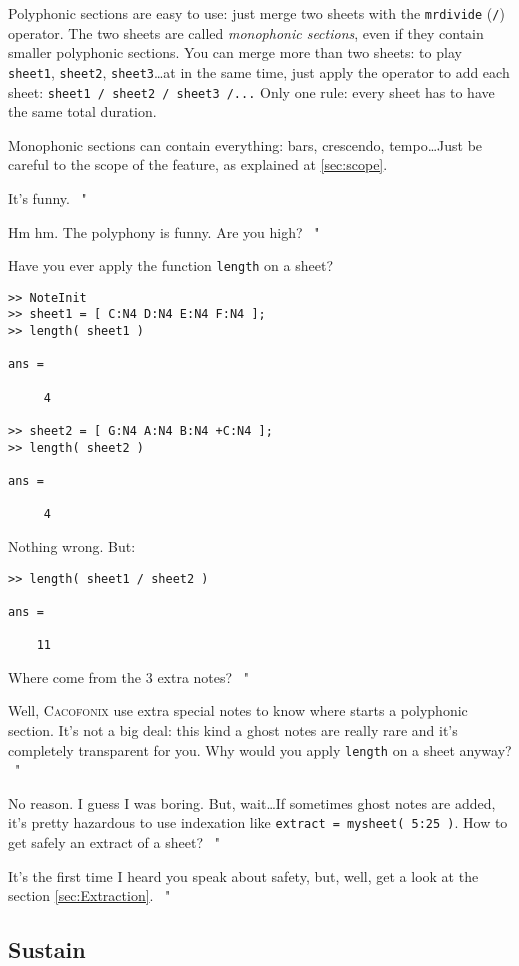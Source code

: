 \documentclass{article}
\newcommand\cacofonix{\textsc{Cacofonix}\xspace}
\newenvironment{meenv}{ \par \noindent \makebox[6em][r]{ \textcolor{mecolor}{Me}: " --~}}{~"}
\newenvironment{myselfenv}{ \par \noindent \makebox[6em][r]{ \textcolor{myselfcolor}{Myself}: " --~}}{~"}
\newcommand{ \me }[1]{%
\begin{meenv}%
	#1%
\end{meenv} }
\newcommand{ \myself }[1]{%
\begin{myselfenv}%
	#1%
\end{myselfenv} }
\begin{document}
Polyphonic sections are easy to use: just merge two sheets with the \lstinline!mrdivide! (\lstinline!/!) operator. The two sheets are called \emph{monophonic sections}, even if they contain smaller polyphonic sections. You can merge more than two sheets: to play \lstinline!sheet1!, \lstinline!sheet2!, \lstinline!sheet3!\dots at in the same time, just apply the operator to add each sheet: \lstinline!sheet1 / sheet2 / sheet3 /...! Only one rule: every sheet has to have the same total duration.

Monophonic sections can contain everything: bars, crescendo, tempo\dots Just be careful to the scope of the feature, as explained at \ref{sec:scope}.

\me{It's funny.}
\myself{Hm hm. The polyphony is funny. Are you high?}
\begin{meenv}%
Have you ever apply the function \lstinline!length! on a sheet?
\begin{lstlisting}
>> NoteInit
>> sheet1 = [ C:N4 D:N4 E:N4 F:N4 ];
>> length( sheet1 )

ans =

     4

>> sheet2 = [ G:N4 A:N4 B:N4 +C:N4 ];
>> length( sheet2 )

ans =

     4

\end{lstlisting}
Nothing wrong. But:
\begin{lstlisting}
>> length( sheet1 / sheet2 )

ans =

    11

\end{lstlisting}
Where come from the $3$ extra notes?%
\end{meenv}
\myself{Well, \cacofonix use extra special notes to know where starts a polyphonic section. It's not a big deal: this kind a ghost notes are really rare and it's completely transparent for you. Why would you apply \lstinline!length! on a sheet anyway?}
\begin{meenv}%
No reason. I guess I was boring. But, wait\dots If sometimes ghost notes are added, it's pretty hazardous to use indexation like \lstinline!extract = mysheet( 5:25 )!. How to get safely an extract of a sheet?%
\end{meenv}
\myself{It's the first time I heard you speak about safety, but, well, get a look at the section \ref{sec:Extraction}.} 

\subsection{Sustain}
\label{sec:Sustain}
\end{document}
